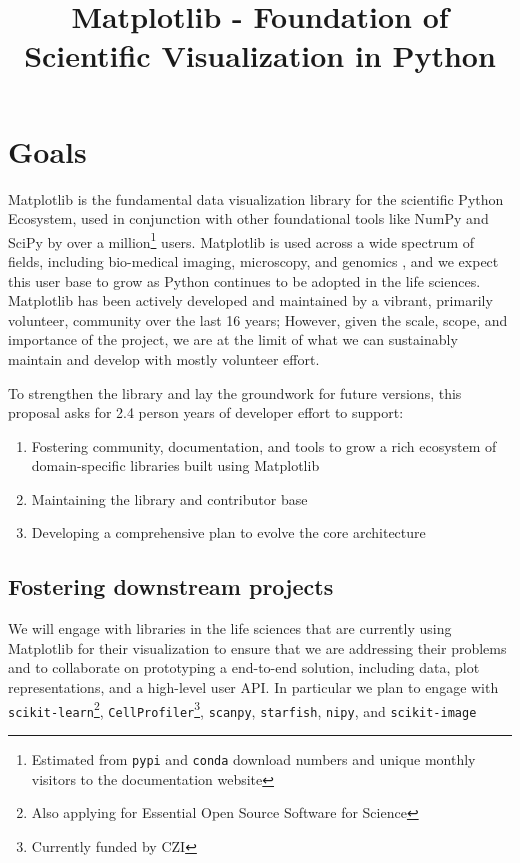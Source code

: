 \documentclass[11pt,letterpaper]{article}  %
\begin{document}
\title{Matplotlib - Foundation of Scientific Visualization in Python}
\author{}
\maketitle

\section{Goals}

Matplotlib\cite{Hunter:2007} is the fundamental 
data visualization library for the scientific Python Ecosystem, used 
in conjunction with other foundational tools like NumPy and
SciPy \cite{Jones2001} by over a million\footnote{Estimated from \texttt{pypi} 
and \texttt{conda} download numbers and unique monthly visitors to the documentation website} users.  
Matplotlib is used across a wide spectrum of fields, including bio-medical imaging,
microscopy, and genomics \cite{Carpenter2006,Wolf2018,10.7717/peerj.453,
  Segata2011,10.1371/journal.pgen.1000695,HASHIMSHONY2012666,
  10.1093/bioinformatics/bts480,Carlile2014,Laganowsky2014,Jiangaac9462,
  10.3389/fninf.2014.00014}, and we expect this user base to grow as Python 
  continues to be adopted in the life sciences. %
Matplotlib has been actively developed and maintained by a vibrant,
primarily volunteer, community over the last 16 years; However, given
the scale, scope, and importance of the project, we are at the limit
of what we can sustainably maintain and develop with mostly
volunteer effort.

To strengthen the library and lay the groundwork for future versions, this proposal asks for 2.4 person years of developer effort to support:


\begin{enumerate}[label=\alph*),noitemsep]
  \item Fostering community, documentation, and tools to grow a rich ecosystem of domain-specific libraries built using Matplotlib 
  \item Maintaining the library and contributor base
  \item Developing a comprehensive plan to evolve the core architecture
\end{enumerate}

\subsection{Fostering downstream projects}
\label{sec:downstream}
We will engage with libraries in the life sciences that are currently
using Matplotlib for their visualization to ensure that we are
addressing their problems and to collaborate on prototyping a
end-to-end solution, including data, plot representations, and a high-level user API.  
In particular we plan to engage with \texttt{scikit-learn}\footnote{Also applying for Essential Open Source
Software for Science}, \texttt{CellProfiler}\footnote{Currently funded
by CZI\label{f:czi}}, \texttt{scanpy}, \texttt{starfish}, \texttt{nipy}, and
\texttt{scikit-image} \cite{10.7717/peerj.453,Carpenter2006, Wolf2018}
\end{document}
